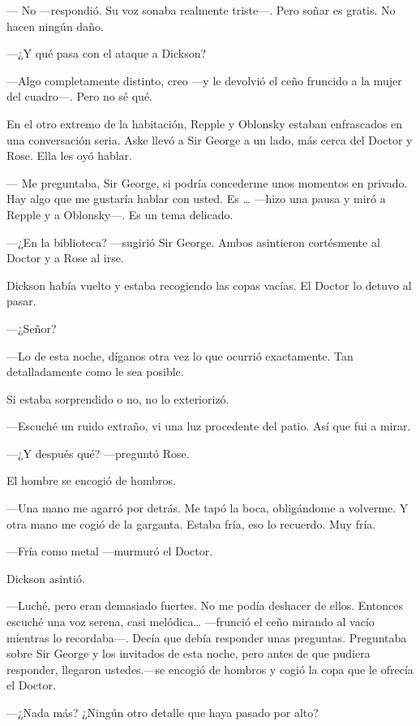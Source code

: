 {--- No ---respondió. Su voz sonaba realmente triste---. Pero soñar es
gratis. No hacen ningún daño.}

{---¿Y qué pasa con el ataque a Dickson?}

{---Algo completamente distinto, creo ---y le devolvió el ceño fruncido
a la mujer del cuadro---. Pero no sé qué.}

{En el otro extremo de la habitación, Repple y Oblonsky estaban
	enfrascados en una conversación seria. Aske llevó a Sir George a un
lado, más cerca del Doctor y Rose. Ella les oyó hablar. }

{--- Me preguntaba, Sir George, si podría concederme unos momentos en
	privado. Hay algo que me gustaría hablar con usted. Es \ldots{} ---hizo
una pausa y miró a Repple y a Oblonsky---. Es un tema delicado.}

{---¿En la biblioteca? ---sugirió Sir George. Ambos asintieron
cortésmente al Doctor y a Rose al irse.}

{Dickson había vuelto y estaba recogiendo las copas vacías. El Doctor lo
detuvo al pasar.}

{---¿Señor?}

{---Lo de esta noche, díganos otra vez lo que ocurrió exactamente. Tan
detalladamente como le sea posible.}

{Si estaba sorprendido o no, no lo exteriorizó.}

{---Escuché un ruido extraño, vi una luz procedente del patio. Así que
fui a mirar.}

{---¿Y después qué? ---preguntó Rose.}

{El hombre se encogió de hombros.}

{---Una mano me agarró por detrás. Me tapó la boca, obligándome a
	volverme. Y otra mano me cogió de la garganta. Estaba fría, eso lo
recuerdo. Muy fría.}

{---Fría como metal ---murmuró el Doctor.}

{Dickson asintió.}

{---Luché, pero eran demasiado fuertes. No me podía deshacer de ellos.
	Entonces escuché una voz serena, casi melódica\ldots{} ---frunció el
	ceño mirando al vacío mientras lo recordaba---. Decía que debía
	responder unas preguntas. Preguntaba sobre Sir George y los invitados de
	esta noche, pero antes de que pudiera responder, llegaron ustedes.---se
encogió de hombros y cogió la copa que le ofrecía el Doctor.}

{---¿Nada más? ¿Ningún otro detalle que haya pasado por alto?}

